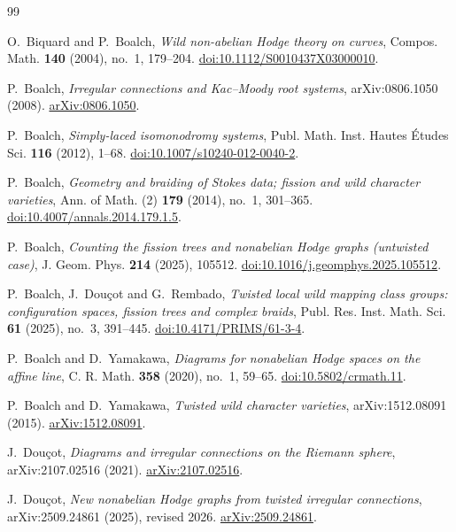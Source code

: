 \documentclass[11pt,a4paper]{amsart}
\theoremstyle{plain}
\theoremstyle{definition}
\begin{document}
\begin{thebibliography}{99}

O.~Biquard and P.~Boalch,
\emph{Wild non-abelian Hodge theory on curves},
Compos. Math. \textbf{140} (2004), no.~1, 179--204.
\href{https://doi.org/10.1112/S0010437X03000010}{doi:10.1112/S0010437X03000010}.

P.~Boalch,
\emph{Irregular connections and Kac--Moody root systems},
arXiv:0806.1050 (2008).
\href{https://arxiv.org/abs/0806.1050}{arXiv:0806.1050}.

P.~Boalch,
\emph{Simply-laced isomonodromy systems},
Publ. Math. Inst. Hautes \'{E}tudes Sci. \textbf{116} (2012), 1--68.
\href{https://doi.org/10.1007/s10240-012-0040-2}{doi:10.1007/s10240-012-0040-2}.

P.~Boalch,
\emph{Geometry and braiding of Stokes data; fission and wild character varieties},
Ann. of Math. (2) \textbf{179} (2014), no.~1, 301--365.
\href{https://doi.org/10.4007/annals.2014.179.1.5}{doi:10.4007/annals.2014.179.1.5}.

P.~Boalch,
\emph{Counting the fission trees and nonabelian Hodge graphs (untwisted case)},
J. Geom. Phys. \textbf{214} (2025), 105512.
\href{https://doi.org/10.1016/j.geomphys.2025.105512}{doi:10.1016/j.geomphys.2025.105512}.

P.~Boalch, J.~Dou\c cot and G.~Rembado,
\emph{Twisted local wild mapping class groups: configuration spaces, fission trees and complex
braids},
Publ. Res. Inst. Math. Sci. \textbf{61} (2025), no.~3, 391--445.
\href{https://doi.org/10.4171/PRIMS/61-3-4}{doi:10.4171/PRIMS/61-3-4}.

P.~Boalch and D.~Yamakawa,
\emph{Diagrams for nonabelian Hodge spaces on the affine line},
C. R. Math. \textbf{358} (2020), no.~1, 59--65.
\href{https://doi.org/10.5802/crmath.11}{doi:10.5802/crmath.11}.

P.~Boalch and D.~Yamakawa,
\emph{Twisted wild character varieties},
arXiv:1512.08091 (2015).
\href{https://arxiv.org/abs/1512.08091}{arXiv:1512.08091}.

J.~Dou\c cot,
\emph{Diagrams and irregular connections on the Riemann sphere},
arXiv:2107.02516 (2021).
\href{https://arxiv.org/abs/2107.02516}{arXiv:2107.02516}.

J.~Dou\c cot,
\emph{New nonabelian Hodge graphs from twisted irregular connections},
arXiv:2509.24861 (2025), revised 2026.
\href{https://arxiv.org/abs/2509.24861}{arXiv:2509.24861}.


\end{thebibliography}
\end{document}
